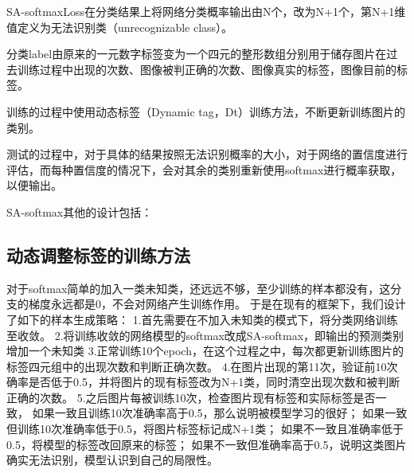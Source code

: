 SA-softmaxLoss在分类结果上将网络分类概率输出由N个，改为N+1个，第N+1维值定义为无法识别类（unrecognizable class）。

分类label由原来的一元数字标签变为一个四元的整形数组分别用于储存图片在过去训练过程中出现的次数、图像被判正确的次数、图像真实的标签，图像目前的标签。

训练的过程中使用动态标签（Dynamic tag，Dt）训练方法，不断更新训练图片的类别。

测试的过程中，对于具体的结果按照无法识别概率的大小，对于网络的置信度进行评估，而每种置信度的情况下，会对其余的类别重新使用softmax进行概率获取，以便输出。

 \begin{table}
  \centering
   \caption{SA-softmax的置信度判断对照表}
   \label{tab:req-pkg}
 \end{table}
SA-softmax其他的设计包括：


\subsection{动态调整标签的训练方法}
对于softmax简单的加入一类未知类，还远远不够，至少训练的样本都没有，这分支的梯度永远都是0，不会对网络产生训练作用。
于是在现有的框架下，我们设计了如下的样本生成策略：
1.首先需要在不加入未知类的模式下，将分类网络训练至收敛。
2.将训练收敛的网络模型的softmax改成SA-softmax，即输出的预测类别增加一个未知类
3.正常训练10个epoch，在这个过程之中，每次都更新训练图片的标签四元组中的出现次数和判断正确次数。
4.在图片出现的第11次，验证前10次确率是否低于0.5，并将图片的现有标签改为N+1类，同时清空出现次数和被判断正确的次数。
5.之后图片每被训练10次，检查图片现有标签和实际标签是否一致，
如果一致且训练10次准确率高于0.5，那么说明被模型学习的很好；
如果一致但训练10次准确率低于0.5，将图片标签标记成N+1类；
如果不一致且准确率低于0.5，将模型的标签改回原来的标签；
如果不一致但准确率高于0.5，说明这类图片确实无法识别，模型认识到自己的局限性。

